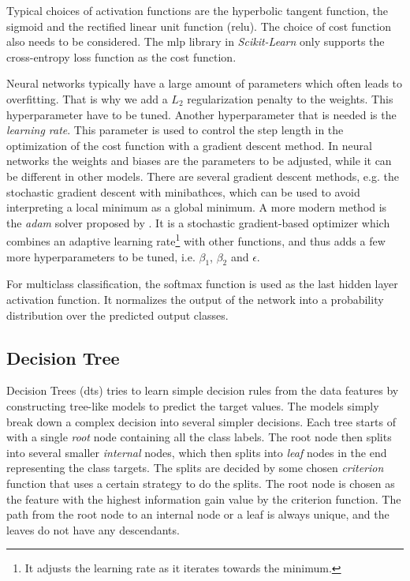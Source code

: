 \documentclass[a4paper, american, 12pt]{report}
\begin{document}
	Typical choices of activation functions are the hyperbolic tangent function, the sigmoid and the rectified linear unit function (\acrshort{relu}). The choice of cost function also needs to be considered. The \acrshort{mlp} library in \textit{Scikit-Learn} only supports the cross-entropy loss function as the cost function.
	
	Neural networks typically have a large amount of parameters which often leads to overfitting. That is why we add a $L_2$ regularization penalty to the weights. This hyperparameter have to be tuned. Another hyperparameter that is needed is the \textit{learning rate}. This parameter is used to control the step length in the optimization of the cost function with a gradient descent method. In neural networks the weights and biases are the parameters to be adjusted, while it can be different in other models. There are several gradient descent methods, e.g. the stochastic gradient descent with minibathces, which can be used to avoid interpreting a local minimum as a global minimum. A more modern method is the \textit{adam} solver proposed by \citet{adam}. It is a stochastic gradient-based optimizer which combines an adaptive learning rate\footnote{It adjusts the learning rate as it iterates towards the minimum.} with other functions, and thus adds a few more hyperparameters to be tuned, i.e. $\beta_1$, $\beta_2$ and $\epsilon$.
	
	For multiclass classification, the softmax function is used as the last hidden layer activation function. It normalizes the output of the network into a probability distribution over the predicted output classes.
	
	
	\subsection{Decision Tree}
	\label{subsect:Theory-DecisionTree}
	Decision Trees (\acrshort{dt}s)\cite{DecisionTree} tries to learn simple decision rules from the data features by constructing tree-like models to predict the target values. The models simply break down a complex decision into several simpler decisions. Each tree starts of with a single \textit{root} node containing all the class labels. The root node then splits into several smaller \textit{internal} nodes, which then splits into \textit{leaf} nodes in the end representing the class targets. The splits are decided by some chosen \textit{criterion} function that uses a certain strategy to do the splits. The root node is chosen as the feature with the highest information gain value by the criterion function. The path from the root node to an internal node or a leaf is always unique, and the leaves do not have any descendants.
	
\end{document}

